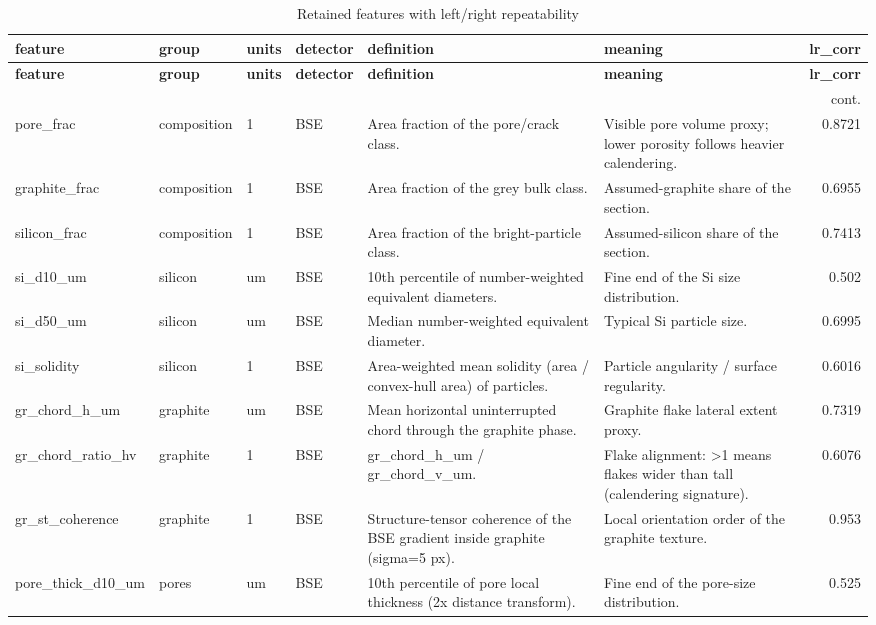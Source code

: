 \documentclass[11pt,a4paper]{article}
\begin{document}
\begin{longtable}{llllp{4.6cm}p{4.2cm}r}
\caption{Retained features with left/right repeatability}\label{tab:featdict}\\
\toprule
\textbf{feature} & \textbf{group} & \textbf{units} & \textbf{detector} & \textbf{definition} & \textbf{meaning} & \textbf{lr\_corr} \\
\midrule
\endfirsthead
\toprule \textbf{feature} & \textbf{group} & \textbf{units} & \textbf{detector} & \textbf{definition} & \textbf{meaning} & \textbf{lr\_corr} \\
\midrule
\endhead
\midrule\multicolumn{7}{r}{\footnotesize cont.}\\\midrule\endfoot
\bottomrule\endlastfoot
pore\_frac & composition & 1 & BSE & Area fraction of the pore/crack class. & Visible pore volume proxy; lower porosity follows heavier calendering. & 0.8721 \\
graphite\_frac & composition & 1 & BSE & Area fraction of the grey bulk class. & Assumed-graphite share of the section. & 0.6955 \\
silicon\_frac & composition & 1 & BSE & Area fraction of the bright-particle class. & Assumed-silicon share of the section. & 0.7413 \\
si\_d10\_um & silicon & um & BSE & 10th percentile of number-weighted equivalent diameters. & Fine end of the Si size distribution. & 0.502 \\
si\_d50\_um & silicon & um & BSE & Median number-weighted equivalent diameter. & Typical Si particle size. & 0.6995 \\
si\_solidity & silicon & 1 & BSE & Area-weighted mean solidity (area / convex-hull area) of particles. & Particle angularity / surface regularity. & 0.6016 \\
gr\_chord\_h\_um & graphite & um & BSE & Mean horizontal uninterrupted chord through the graphite phase. & Graphite flake lateral extent proxy. & 0.7319 \\
gr\_chord\_ratio\_hv & graphite & 1 & BSE & gr\_chord\_h\_um / gr\_chord\_v\_um. & Flake alignment: >1 means flakes wider than tall (calendering signature). & 0.6076 \\
gr\_st\_coherence & graphite & 1 & BSE & Structure-tensor coherence of the BSE gradient inside graphite (sigma=5 px). & Local orientation order of the graphite texture. & 0.953 \\
pore\_thick\_d10\_um & pores & um & BSE & 10th percentile of pore local thickness (2x distance transform). & Fine end of the pore-size distribution. & 0.525 \\

\end{longtable}
\end{document}
